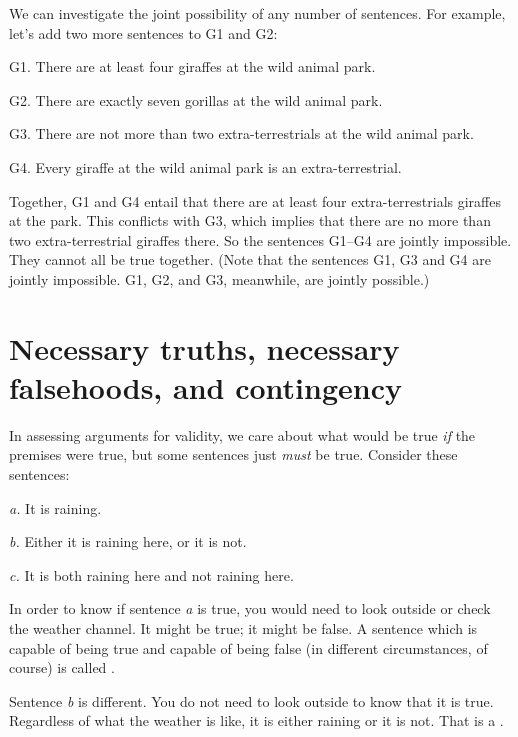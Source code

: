 We can investigate the joint possibility of any number of sentences. For example, let's add two more sentences to G1 and G2:
	\begin{ebullet}	
		\item[G1.] There are at least four giraffes at the wild animal park.
		\item[G2.] There are exactly seven gorillas at the wild animal park.
		\item[G3.] There are not more than two extra-terrestrials at the wild animal park.
		\item[G4.] Every giraffe at the wild animal park is an extra-terrestrial.
	\end{ebullet}
Together, G1 and G4 entail that there are at least four extra-terrestrials giraffes at the park. This conflicts with G3, which implies that there are no more than two extra-terrestrial giraffes there. So the sentences G1--G4 are jointly impossible. They cannot all be true together. (Note that the sentences G1, G3 and G4 are jointly impossible. G1, G2, and G3, meanwhile, are jointly possible.)

\section[Necessary truths, falsehoods, and contingency]{Necessary truths, necessary falsehoods, and contingency}\label{s:nec-truth}

In assessing arguments for validity, we care about what would be true \emph{if} the premises were true, but some sentences just \emph{must} be true. Consider these sentences:
	\begin{earg}
		\item[\textit{a.}] It is raining.
		\item[\textit{b.}] Either it is raining here, or it is not.
		\item[\textit{c.}] It is both raining here and not raining here.
	\end{earg}
In order to know if sentence \textit{a} is true, you would need to look outside or check the weather channel. It might be true; it might be false. A sentence which is capable of being true and capable of being false (in different circumstances, of course) is called .

Sentence \textit{b} is different. You do not need to look outside to know that it is true. Regardless of what the weather is like, it is either raining or it is not. That is a . 

